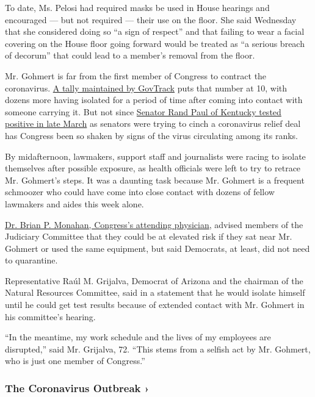 To date, Ms. Pelosi had required masks be used in House hearings and
encouraged --- but not required --- their use on the floor. She said
Wednesday that she considered doing so ``a sign of respect'' and that
failing to wear a facial covering on the House floor going forward would
be treated as ``a serious breach of decorum'' that could lead to a
member's removal from the floor.

Mr. Gohmert is far from the first member of Congress to contract the
coronavirus. \href{https://www.govtrack.us/covid-19\#legislators}{A
tally maintained by GovTrack} puts that number at 10, with dozens more
having isolated for a period of time after coming into contact with
someone carrying it. But not since
\href{https://www.nytimes.com/2020/03/22/us/politics/coronavirus-rand-paul.html}{Senator
Rand Paul of Kentucky tested positive in late March} as senators were
trying to cinch a coronavirus relief deal has Congress been so shaken by
signs of the virus circulating among its ranks.

By midafternoon, lawmakers, support staff and journalists were racing to
isolate themselves after possible exposure, as health officials were
left to try to retrace Mr. Gohmert's steps. It was a daunting task
because Mr. Gohmert is a frequent schmoozer who could have come into
close contact with dozens of fellow lawmakers and aides this week alone.

\href{https://www.nytimes.com/2020/05/16/us/politics/congress-doctor-virus-brian-monahan.html}{Dr.
Brian P. Monahan, Congress's attending physician}, advised members of
the Judiciary Committee that they could be at elevated risk if they sat
near Mr. Gohmert or used the same equipment, but said Democrats, at
least, did not need to quarantine.

Representative Raúl M. Grijalva, Democrat of Arizona and the chairman of
the Natural Resources Committee, said in a statement that he would
isolate himself until he could get test results because of extended
contact with Mr. Gohmert in his committee's hearing.

``In the meantime, my work schedule and the lives of my employees are
disrupted,'' said Mr. Grijalva, 72. ``This stems from a selfish act by
Mr. Gohmert, who is just one member of Congress.''

\href{https://www.nytimes.com/news-event/coronavirus?action=click\&pgtype=Article\&state=default\&region=MAIN_CONTENT_3\&context=storylines_faq}{}

\hypertarget{the-coronavirus-outbreak-}{%
\subsubsection{The Coronavirus Outbreak
›}\label{the-coronavirus-outbreak-}}

